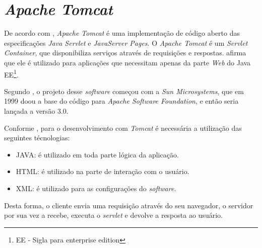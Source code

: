 \section{\textit{Apache Tomcat}}

	\par De acordo com , \textit{Apache Tomcat} é uma
implementação de código aberto das especificações \textit{Java Servlet} e
\textit{JavaServer Pages}. O \textit{Apache Tomcat} é um \textit{Servlet
Container}, que disponibiliza serviços através de requisições e respostas.
 afirma que ele é utilizado para aplicações que necessitam
apenas da parte \textit{Web} do Java EE\footnote{EE - Sigla para enterprise
edition}.

	\par Segundo , o projeto desse \textit{software}
começou com a \textit{Sun Microsystems}, que em 1999 doou a base do código para
\textit{Apache Software Foundation}, e então seria lançada a versão 3.0.

	\par Conforme , para o desenvolvimento com
	\textit{Tomcat} é necessária a utilização das seguintes técnologias:
	
	\begin{itemize}
	  
	  \item JAVA: é utilizado em toda parte lógica da aplicação.
	  
	  \item HTML: é utilizado na parte de interação com o usuário.
	  
	  \item XML: é utilizado para as configurações do \textit{software}. 
	
	\end{itemize}
 
 
 
	\par Desta forma, o cliente envia uma requisição através do seu navegador, o
servidor por sua vez a recebe, executa o \textit{servlet} e devolve a resposta
ao usuário.